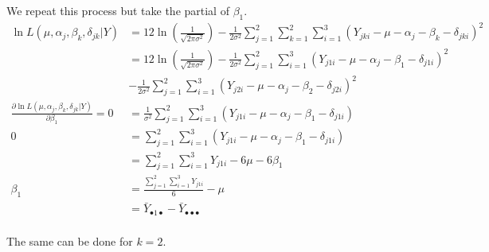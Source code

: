 \documentclass{article}
\begin{document}
We repeat this process but take the partial of $\beta_1$.
\begin{align*}
    \ln L(\mu, \alpha_j, \beta_k, \delta_{jk} | Y)
    &=
    12 \ln\left(\frac{1}{\sqrt{2\pi\sigma^2}}\right)
    -\frac{1}{2\sigma^2}\sum_{j=1}^2\sum_{k=1}^2\sum_{i=1}^3
    (Y_{jki} - \mu - \alpha_j - \beta_k - \delta_{jki})^2 \\
    &=
    12 \ln\left(\frac{1}{\sqrt{2\pi\sigma^2}}\right)
    -\frac{1}{2\sigma^2}\sum_{j=1}^2\sum_{i=1}^3
    (Y_{j1i} - \mu - \alpha_j - \beta_1 - \delta_{j1i})^2 \\
    &-\frac{1}{2\sigma^2}\sum_{j=1}^2\sum_{i=1}^3
    (Y_{j2i} - \mu - \alpha_j - \beta_2 - \delta_{j2i})^2 \\
    \frac{\partial\ln L(\mu, \alpha_j, \beta_k, \delta_{jk} | Y)}{\partial \beta_1}
    = 0 &=
    \frac{1}{\sigma^2}\sum_{j=1}^2\sum_{i=1}^3
    (Y_{j1i} - \mu - \alpha_j - \beta_1 - \delta_{j1i}) \\
    0 &=
    \sum_{j=1}^2\sum_{i=1}^3
    (Y_{j1i} - \mu - \alpha_j - \beta_1 - \delta_{j1i}) \\
    &= \sum_{j=1}^2\sum_{i=1}^3Y_{j1i} - 6\mu - 6\beta_1 \\
    \beta_1 &= \frac{\sum_{j=1}^2\sum_{i=1}^3Y_{j1i}}{6} - \mu \\
    &= \bar{Y}_{\bullet 1 \bullet} - \bar{Y}_{\bullet\bullet\bullet} \\
\end{align*}

The same can be done for $k=2$.
\end{document}
